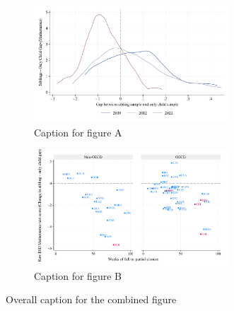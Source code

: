


\begin{figure}[htbp]
    \centering
    
    \begin{subfigure}{\textwidth}
        \centering
        \includegraphics[width=0.8\textwidth]{./FIGURES/Descriptive/PISA_gap_PV1MATH_histogram_2009_2022.pdf}
        \caption{Caption for figure A}
        \label{fig:1a}
    \end{subfigure}
    
    \vspace{1em} %
    
    \begin{subfigure}{\textwidth}
        \centering
        \includegraphics[width=0.8\textwidth]{./FIGURES/Descriptive/PISA_raw_DID_PV1MATH_not_fully_open.pdf}
        \caption{Caption for figure B}
        \label{fig:1b}
    \end{subfigure}
    
    \caption{Overall caption for the combined figure}
    \label{fig:combined}
\end{figure}



\newpage



